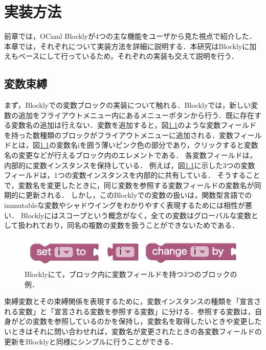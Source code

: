 \chapter{実装方法}\label{chap:impl}

前章では，OCaml Blocklyが4つの主な機能をユーザから見た視点で紹介した．
本章では，それぞれについて実装方法を詳細に説明する．本研究はBlocklyに加え\cite{Typed-Blockly}もベースにして行っているため，それぞれの実装も交えて説明を行う．

\section {変数束縛\label{impl:boundVariable}}

まず，Blocklyでの変数ブロックの実装について触れる．Blocklyでは，新しい変数の追加をフライアウトメニュー内にあるメニューボタンから行う．既に存在する変数名の追加は行えない．変数を追加すると，図\ref{fig:blocklyVar}のような変数フィールドを持った数種類のブロックがフライアウトメニューに追加される．変数フィールドとは，図\ref{fig:blocklyVar}の変数名iを囲う薄いピンク色の部分であり，クリックすると変数名の変更などが行えるブロック内のエレメントである．
各変数フィールドは，内部的に変数インスタンスを保持している．
例えば，図\ref{fig:blocklyVar}に示した3つの変数フィールドは，1つの変数インスタンスを内部的に共有している．
そうすることで，変数名を変更したときに，同じ変数を参照する変数フィールドの変数名が同期的に更新される．
しかし，このBlocklyでの変数の扱いは，関数型言語でのimmutableな変数やシャドウイングをわかりやすく表現するためには相性が悪い．
Blocklyにはスコープという概念がなく，全ての変数はグローバルな変数として扱われており，同名の複数の変数を扱うことができないためである．

\begin{figure}[h]
 \centering
 \includegraphics[keepaspectratio, scale=0.3]{img/iVar.png}
 \caption{Blocklyにて，ブロック内に変数フィールドを持つ3つのブロックの例．\label{fig:blocklyVar}}
\end{figure}

束縛変数とその束縛関係を表現するために，変数インスタンスの種類を「宣言される変数」と「宣言される変数を参照する変数」に分ける．参照する変数は，自身がどの変数を参照しているのかを保持し，変数名を取得したいときや変更したいときはそれに問い合わせれば，変数名が変更されたときの各変数フィールドの更新をBlocklyと同様にシンプルに行うことができる．

